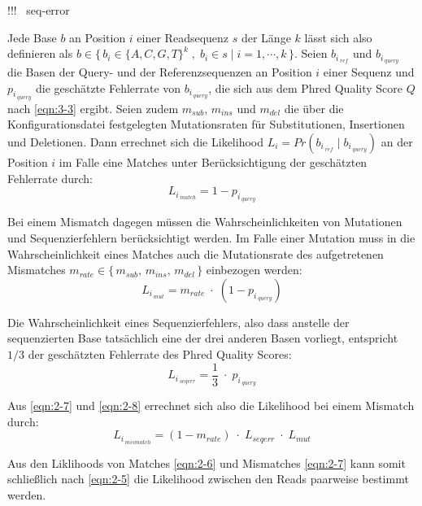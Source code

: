 !!!~\cite{kuhner_2014} seq-error

Jede Base $ b $ an Position $ i $ einer Readsequenz $ s $ der Länge $ k $ lässt sich also definieren als $ b \in \{\,b_{i}\in \{A,C,G,T\}^k\;,\; b_{i} \in s \;|\; i = 1, \dotsb, k \,\}$. Seien $ b_{i\,_{ref}} $ und $ b_{i\,_{query}} $ die Basen der Query- und der Referenzsequenzen an Position $ i $ einer Sequenz und $  p_{i\,_{query}} $ die geschätzte Fehlerrate von $ b_{i\,_{query}} $, die sich aus dem Phred Quality Score $ Q $ nach  \eqref{eqn:3-3} ergibt. Seien zudem $ m_{sub} $, $ m_{ins} $ und $ m_{del} $ die über die Konfigurationsdatei festgelegten Mutationsraten für Substitutionen, Insertionen und Deletionen. Dann errechnet sich die Likelihood $ L_{i} = Pr(b_{i\,_{ref}}\;|\; b_{i\,_{query}})$ an der Position $ i $ im Falle eine Matches unter Berücksichtigung der geschätzten Fehlerrate durch:
\begin{equation} \label{eqn:2-6}
\tag{2-6}
L_{i\,_{match}} = 1 - p_{i\,_{query}}
\end{equation}

Bei einem Mismatch dagegen müssen die Wahrscheinlichkeiten von Mutationen und Sequenzierfehlern berücksichtigt werden. Im Falle einer Mutation muss in die Wahrscheinlichkeit eines Matches auch die Mutationsrate des aufgetretenen Mismatches $ m_{rate} \in \{\,m_{sub},\,  m_{ins},\, m_{del}\,\} $ einbezogen werden:
\begin{equation} \label{eqn:2-7}
\tag{2-7}
L_{i\,_{mut}} = m_{rate}\; \cdotp \;(1 - p_{i\,_{query}})
\end{equation}

Die Wahrscheinlichkeit eines Sequenzierfehlers, also dass anstelle der sequenzierten Base tatsächlich eine der drei anderen Basen vorliegt, entspricht $ 1/3 $ der geschätzten Fehlerrate des Phred Quality Scores:
\begin{equation} \label{eqn:2-8}
\tag{2-8}
L_{i\,_{seqerr}} = \frac{1}{3} \; \cdotp \; p_{i\,_{query}}
\end{equation}

Aus \eqref{eqn:2-7} und \eqref{eqn:2-8} errechnet sich also die Likelihood bei einem Mismatch durch:
\begin{equation} \label{eqn:2-9}
\tag{2-9}
L_{i\,_{mismatch}} = (1-m_{rate}) \; \cdotp \; L_{seqerr} \; \cdotp \; L_{mut}
\end{equation}

Aus den Liklihoods von Matches \eqref{eqn:2-6} und Mismatches \eqref{eqn:2-7} kann somit schließlich nach \eqref{eqn:2-5} die Likelihood zwischen den Reads paarweise bestimmt werden.\\


